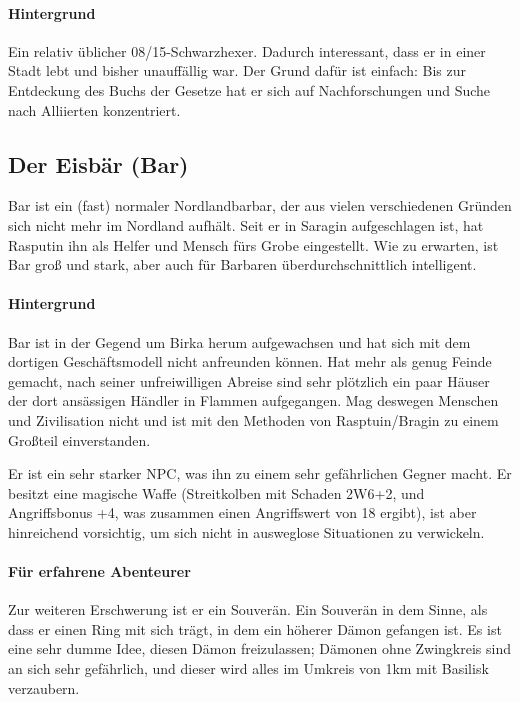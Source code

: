 \documentclass[a4paper,10pt]{scrartcl}
\def\drugname{Basilisk}
\begin{document}
\paragraph{Hintergrund} Ein relativ üblicher 08/15-Schwarzhexer. Dadurch
interessant, dass er in einer Stadt lebt und bisher unauffällig war. Der
Grund dafür ist einfach: Bis zur Entdeckung des Buchs der Gesetze hat er
sich auf Nachforschungen und Suche nach Alliierten konzentriert.

\bestiarium[name=Stansilav Rasputin, mag=true, typ=Mensch, grad=6,
In=m97, LP=21, AP=78, zauberEW=18, St=45, Gw=65]{}

\subsection{Der Eisbär (Bar)}

Bar ist ein (fast) normaler Nordlandbarbar, der aus vielen verschiedenen
Gründen sich nicht mehr im Nordland aufhält. Seit er in Saragin
aufgeschlagen ist, hat Rasputin ihn als Helfer und Mensch fürs Grobe
eingestellt. Wie zu erwarten, ist Bar groß und stark, aber auch für
Barbaren überdurchschnittlich intelligent.

\paragraph{Hintergrund} Bar ist in der Gegend um Birka herum
aufgewachsen und hat sich mit dem dortigen Geschäftsmodell nicht
anfreunden können. Hat mehr als genug Feinde gemacht, nach seiner
unfreiwilligen Abreise sind sehr plötzlich ein paar Häuser der dort
ansässigen Händler in Flammen aufgegangen. Mag deswegen Menschen und
Zivilisation nicht und ist mit den Methoden von Rasptuin/Bragin zu einem
Großteil einverstanden.

Er ist ein sehr starker NPC, was ihn zu einem sehr gefährlichen
Gegner macht. Er besitzt eine magische Waffe (Streitkolben mit Schaden
2W6+2, und Angriffsbonus +4, was zusammen einen Angriffswert von 18
ergibt), ist aber hinreichend vorsichtig, um sich nicht in ausweglose
Situationen zu verwickeln.

\paragraph{Für erfahrene Abenteurer} Zur weiteren Erschwerung ist er ein
Souverän. Ein Souverän in dem Sinne, als dass er einen Ring mit sich
trägt, in dem ein höherer Dämon gefangen ist. Es ist eine sehr dumme
Idee, diesen Dämon freizulassen; Dämonen ohne Zwingkreis sind an sich
sehr gefährlich, und dieser wird alles im Umkreis von 1km mit
\drugname{} verzaubern.
\end{document}
